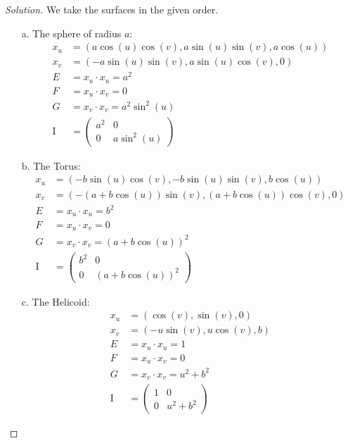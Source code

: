 \documentclass[Shifrin_Solutions_Spring_2015]{subfiles}
\begin{document}
\begin{proof}[Solution] We take the surfaces in the given order.
\begin{itemize}
\item[a.] The sphere of radius $a$:
\begin{align*}
x_u & = \left( a \cos(u)\cos(v) , a \sin(u)\sin(v) , a \cos(u) \right) \\
x_v & = \left( -a \sin(u)\sin(v) , a \sin(u)\cos(v), 0 \right) \\
E & = x_u\cdot x_u = a^2 \\
F & = x_u\cdot x_v = 0 \\
G & = x_v\cdot x_v = a^2\sin^2(u) \\
\mathrm{I} &= \begin{pmatrix} a^2 & 0 \\  0 & a\sin^2(u) \end{pmatrix}
\end{align*}

\item[b.] The Torus:
\begin{align*}
x_u & = \left(-b\sin(u)\cos(v) , -b\sin(u)\sin(v) , b\cos(u) \right) \\
x_v & = \left( -(a+b\cos(u))\sin(v) , (a+b\cos(u))\cos(v) , 0 \right) \\
E & = x_u\cdot x_u = b^2 \\
F & = x_u\cdot x_v =  0 \\
G & = x_v\cdot x_v = \left(a+b\cos(u) \right)^2 \\
\mathrm{I} & = \begin{pmatrix}  b^2 & 0 \\ 0& \left(a+b\cos(u) \right)^2\end{pmatrix}
\end{align*}

\item[c.] The Helicoid:
\begin{align*}
x_u & = \left(\cos(v), \sin(v), 0 \right) \\
x_v & = \left( -u\sin(v) , u\cos(v) , b\right) \\
E & = x_u\cdot x_u = 1 \\
F & = x_u\cdot x_v = 0 \\
G & = x_v\cdot x_v = u^2+b^2 \\
\mathrm{I} &= \begin{pmatrix} 1 & 0 \\ 0 &  u^2+b^2 \end{pmatrix}
\end{align*}


\end{itemize}
\end{proof}
\end{document}

